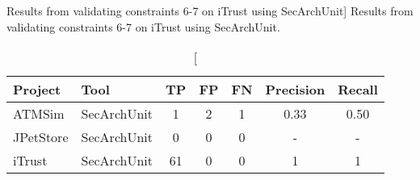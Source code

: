 \begin{table}[h]
\captionsetup{justification=centering}
\caption
    [Results from validating constraints 6-7 on iTrust using SecArchUnit]
    {Results from validating constraints 6-7 on iTrust using SecArchUnit.}
\begin{center}
\begin{tabular}{llccccc}
\textbf{Project} & \textbf{Tool}    & \textbf{TP} & \textbf{FP} & \textbf{FN} & \textbf{Precision} & \textbf{Recall} \\
\hline
ATMSim     & SecArchUnit & 1 & 2  & 1  & 0.33         & 0.50    \\
JPetStore  & SecArchUnit & 0 & 0  & 0  & -         & -    \\
iTrust     & SecArchUnit & 61 & 0  & 0  & 1         & 1    \\
\hline
\end{tabular}
\end{center}
\label{tab:tool_extension}
\end{table}